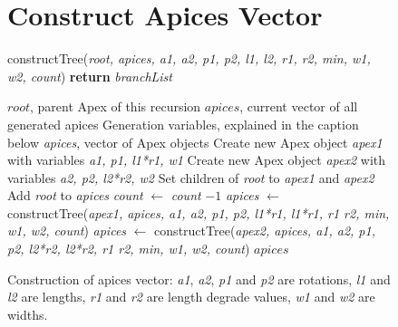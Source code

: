 \documentclass[final]{cmpreport}
\begin{document}
\begin{figure}[ht]
    \section{Construct Apices Vector}
    \label{app:construct-tree}
    \begin{algorithm}[H]
    \caption{constructTree(\emph{root, apices, a1, a2, p1, p2, l1, l2, r1, r2, min, w1, w2, count}) {\textbf{return}} \emph{branchList}}
        \begin{algorithmic}[1]
        \Require $root$, parent Apex of this recursion
        \Require $apices$, current vector of all generated apices
        \Require Generation variables, explained in the caption below
        \Ensure \emph{apices}, vector of Apex objects
        \State Create new Apex object \emph{apex1} with variables \emph{a1, p1, l1*r1, w1}
        \State Create new Apex object \emph{apex2} with variables \emph{a2, p2, l2*r2, w2}
        \State Set children of \emph{root} to \emph{apex1} and \emph{apex2}
        \State Add \emph{root} to \emph{apices}      
        \State \emph{count} $\leftarrow$ \emph{count} $- 1$  
                \State \emph{apices} $\leftarrow$ constructTree(\emph{apex1, apices, a1, a2, p1, p2, l1*r1, l1*r1, r1 r2, min, w1, w2, count})
            \EndIf
                \State \emph{apices} $\leftarrow$ constructTree(\emph{apex2, apices, a1, a2, p1, p2, l2*r2, l2*r2, r1 r2, min, w1, w2, count})
            \EndIf
        \EndIf
        \State \Return $apices$
        \end{algorithmic}
    \end{algorithm}
    \caption{Construction of apices vector: \emph{a1}, \emph{a2}, \emph{p1} and \emph{p2} are rotations,
            \emph{l1} and \emph{l2} are lengths, \emph{r1} and \emph{r2} are length degrade values, 
            \emph{w1} and \emph{w2} are widths.}
\end{figure}
\end{document}

